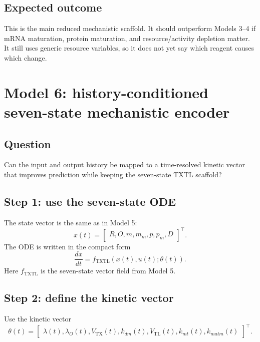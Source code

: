 \documentclass[11pt]{article}
\newcommand{\TX}{\mathrm{TX}}
\newcommand{\TL}{\mathrm{TL}}
\begin{document}
\subsection{Expected outcome}

This is the main reduced mechanistic scaffold. It should outperform Models 3--4 if mRNA maturation, protein maturation, and resource/activity depletion matter. It still uses generic resource variables, so it does not yet say which reagent causes which change.

\section{Model 6: history-conditioned seven-state mechanistic encoder}

\subsection{Question}
Can the input and output history be mapped to a time-resolved kinetic vector that improves prediction while keeping the seven-state TXTL scaffold? 

\subsection{Step 1: use the seven-state ODE}

The state vector is the same as in Model 5:
\begin{equation}
    x(t)=
    \begin{bmatrix}
        R,O,m,m_m,p,p_m,D
    \end{bmatrix}^{\top}.
\end{equation}
The ODE is written in the compact form
\begin{equation}
    \frac{dx}{dt}=f_{\mathrm{TXTL}}(x(t),u(t);\theta(t)).
\end{equation}
Here $f_{\mathrm{TXTL}}$ is the seven-state vector field from Model 5.

\subsection{Step 2: define the kinetic vector}

Use the kinetic vector
\begin{equation}
    \theta(t)=
    \begin{bmatrix}
        \lambda(t),
        \lambda_O(t),
        V_{\TX}(t),
        k_{dm}(t),
        V_{\TL}(t),
        k_{mt}(t),
        k_{matm}(t)
    \end{bmatrix}^{\top}.
\end{equation}
\end{document}
